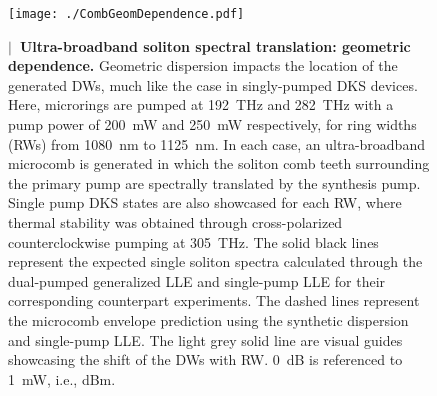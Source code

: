\documentclass[reprint,superscriptaddress, amsmath,amssymb,pra, aps,floatfix,longbibliography]{revtex4-1}
\begin{document}
\begin{figure}[t!]
 \begin{center}
  \texttt{[image: ./CombGeomDependence.pdf]}
 \end{center}
 \caption{\label{fig:CombGeomDependence}\textbf{$|$~Ultra-broadband soliton spectral translation: geometric dependence.} Geometric dispersion impacts the location of the generated DWs, much like the case in singly-pumped DKS devices. Here, microrings are pumped at 192~THz and 282~THz with a pump power of 200~mW and 250~mW respectively, for ring widths (RWs) from 1080~nm to 1125~nm. In each case, an ultra-broadband microcomb is generated in which the soliton comb teeth surrounding the primary pump are spectrally translated by the synthesis pump. Single pump DKS states are also showcased for each RW, where thermal stability was obtained through cross-polarized counterclockwise pumping at 305~THz. The solid black lines represent the expected single soliton spectra calculated through the dual-pumped generalized LLE and single-pump LLE for their corresponding counterpart experiments. The dashed lines represent the microcomb envelope prediction using the synthetic dispersion and single-pump LLE. The light grey solid line are visual guides showcasing the shift of the DWs with RW. 0~dB is referenced to 1~mW, i.e., dBm.}
\end{figure}%
\end{document}
